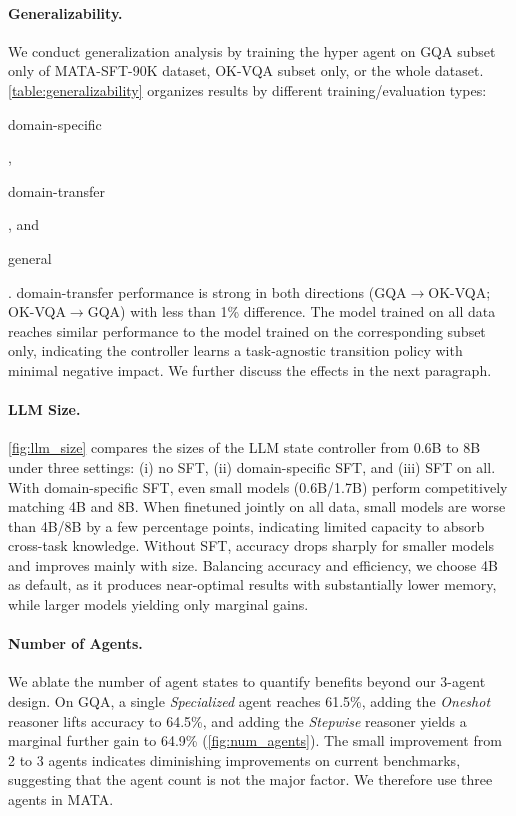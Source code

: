 \documentclass{article} %
\DeclareRobustCommand{\legendbg}[2]{%
\unskip
  \begingroup\setlength{\fboxsep}{0pt}
  \colorbox{#1}{\strut #2}%
  \endgroup
}
\newcommand{\revise}[1]{{#1}}
\newcommand{\methodname}{MATA}
\newcommand{\datasetname}{\methodname-SFT-90K}
\begin{document}
\paragraph{Generalizability.} \label{para:generalizability} We conduct generalization analysis by training the hyper agent on GQA subset only of \datasetname{} dataset, OK-VQA subset only, or the whole dataset. \autoref{table:generalizability} organizes results by different training/evaluation types: \legendbg{green!20}{domain-specific}, \legendbg{yellow!25}{\revise{domain-transfer}}, and \legendbg{blue!15}{general}. \revise{domain-transfer} performance is strong in both directions (GQA$\to$OK-VQA; OK-VQA$\to$GQA) with less than 1\% difference. The model trained on all data reaches similar performance to the model trained on the corresponding subset only, indicating the controller learns a task-agnostic transition policy with minimal negative impact. We further discuss the effects in the next paragraph.

\paragraph{LLM Size.} \autoref{fig:llm_size} compares the sizes of the LLM state controller from 0.6B to 8B under three settings: (i) no SFT, (ii) domain-specific SFT, and (iii) SFT on all. With domain-specific SFT, even small models (0.6B/1.7B) perform competitively matching 4B and 8B. When finetuned jointly on all data, small models are worse than 4B/8B by a few percentage points, indicating limited capacity to absorb cross-task knowledge. Without SFT, accuracy drops sharply for smaller models and improves mainly with size. Balancing accuracy and efficiency, we choose 4B as default, as it produces near-optimal results with substantially lower memory, while larger models yielding only marginal gains.

\revise{\paragraph{Number of Agents.} We ablate the number of agent states to quantify benefits beyond our 3-agent design. On GQA, a single \emph{Specialized} agent reaches 61.5\%, adding the \emph{Oneshot} reasoner lifts accuracy to 64.5\%, and adding the \emph{Stepwise} reasoner yields a marginal further gain to 64.9\% (\autoref{fig:num_agents}). The small improvement from 2 to 3 agents indicates diminishing improvements on current benchmarks, suggesting that the agent count is not the major factor. We therefore use three agents in \methodname{}.}
\end{document}
